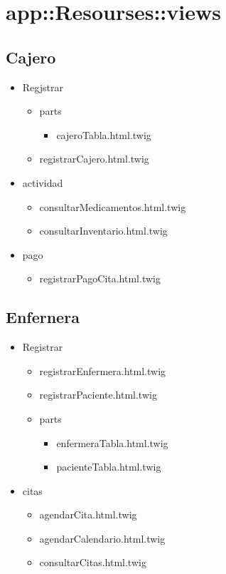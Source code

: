 	
	
	\section{app::Resourses::views}
		\subsection{Cajero}
		\begin{itemize}
			\item Regjstrar
			\begin{itemize}
				\item parts
				\begin{itemize}
					\item cajeroTabla.html.twig
				\end{itemize}
				\item registrarCajero.html.twig
			\end{itemize}
			\item actividad
			\begin{itemize}
				\item consultarMedicamentos.html.twig
				\item consultarInventario.html.twig
			\end{itemize}
			\item pago
			\begin{itemize}
				\item registrarPagoCita.html.twig
			\end{itemize}
		\end{itemize}
		
		\subsection{Enfernera}
		\begin{itemize}
		\item Registrar
		\begin{itemize}
		\item registrarEnfermera.html.twig
		\item registrarPaciente.html.twig
		\item parts
			\begin{itemize}
				\item enfermeraTabla.html.twig
				\item pacienteTabla.html.twig
			\end{itemize}
		\end{itemize}
		\item citas 
			\begin{itemize}
				\item agendarCita.html.twig
				\item agendarCalendario.html.twig
				\item consultarCitas.html.twig
			\end{itemize}
		\end{itemize}
		
